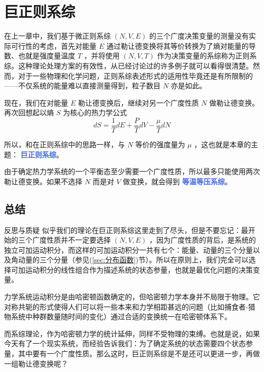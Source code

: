 \documentclass[hyperref,UTF-8]{ctexbook}
\newcommand{\0}{\boldsymbol{0}}
\begin{document}
\chapter{巨正则系综}\label{cha:巨正则系综}

在上一章中，我们基于微正则系综 $(N,V,E)$ 的三个广度决策变量的测量没有实际可行性的考虑，首先对能量 $E$ 通过勒让德变换将其等价转换为了熵对能量的导数、也就是强度量温度 $T$ ，并将使用 $(N,V,T)$ 作为决策变量的系综称为正则系综。这种理论处理方案的有效性，从已经讨论过的许多例子就可以看得很清楚。然而，对于一些物理和化学问题，正则系综表述形式的适用性毕竟还是有所限制的——不仅系统的能量难以直接测量得到，粒子数目 $N$ 亦是如此。

现在，我们在对能量 $E$ 勒让德变换后，继续对另一个广度性质 $N$ 做勒让德变换。再次回想起以熵 $S$ 为核心的热力学公式
\[
    dS = \frac{1}{T} dE + \frac{P}{T} dV - \frac{\mu}{T} dN
\]

所以，和在正则系综中的思路一样，与 $N$ 等价的强度量为 $\mu$ ，这也就是本章的主题： \textcolor{RoyalBlue}{\textbf{\kaishu 巨正则系综}}。

由于确定热力学系统的一个平衡态至少需要一个广度性质，所以最多只能使用两次勒让德变换。如果不选择 $N$ 而是对 $V$ 做变换，就会得到 \textcolor{RoyalBlue}{\textbf{\kaishu 等温等压系综}}。



\section{总结}\label{sec:巨正则总结}

\begin{justification}{\kaishu 反思与质疑}
\kaishu \fontsize{11pt}{16pt}
    \quad\quad 似乎我们的理论在巨正则系综这里走到了尽头，但是不要忘记：最开始的三个广度性质并不一定要选择 $(N,V,E)$ ，因为广度性质的背后，是系统的独立可加运动积分，而这样的可加运动积分一共有七个：能量、动量的三个分量以及角动量的三个分量（参见(\ref*{sec:分布函数})节）。所以在原则上，我们完全可以选择可加运动积分的线性组合作为描述系统的状态参量，也就是最优化问题的决策变量。

    \quad\quad 力学系统运动积分是由哈密顿函数确定的，但哈密顿力学本身并不局限于物理。它对称共轭的形式使得人们可以将一些本来和力学相距甚远的问题（比如捕食者-猎物系统中种群数量随时间的变化）通过合适的变换统一在哈密顿体系下。
    
    \quad\quad 而系综理论，作为哈密顿力学的统计延伸，同样不受物理的束缚。也就是说，如果今天有了一个现实系统，而经验告诉我们：为了确定系统的状态需要四个状态参量，其中要有一个广度性质。那么这时，巨正则系综是不是还可以更进一步，再做一组勒让德变换呢？
\end{justification}
\end{document}
